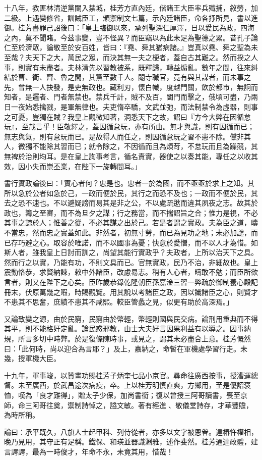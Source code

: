 \begin{pinyinscope}
十八年，教匪林清逆黨闌入禁城，桂芳方直內廷，偕諸王大臣率兵殲捕，敘勞，加二級。上遇變修省，訓誡臣工，頒禦制文七篇，示內廷諸臣，命各抒所見，書以進御。桂芳書罪己詔後曰：「皇上臨御以來，承列聖深仁厚澤，日以愛民為政，四海之內，莫不聞睹。今茲事變，豈不怪異？而臣竊以為此未足為聖德之累。昔孔子論仁至於濟眾，論敬至於安百姓，皆曰：『堯、舜其猶病諸。』豈真以堯、舜之聖為未至哉？夫天下之大，萬民之眾，而決其無一夫之梗者，蓋自古其難之。然而揆之人事，則實有未盡者。夫林清先以習教被系，既釋歸，轉益煽亂。數年之間，往來糾結於曹、衛、齊、魯之間，其黨至數千人。閹寺職官，竟有與其謀者，而未事之先，曾無一人抉發，是吏無政也。藏利刃，懷白幟，度越門關，飲於都市，無詗而知者，是邏者、門者無禁也。禁兵千計，賊不及百，闔門而擊之，俄頃可盡，乃兩日一夜始悉擒戮，是軍無律也。夫吏惰卒驕，文武並弛，而法制禁令為虛器，則事之可憂，豈獨在賊？我皇上觀微知著，洞悉天下之故，詔曰『方今大弊在因循怠玩』，至哉言乎！臣敬繹之，蓋因循怠玩，亦有所由。無才與識，則有因循而已；無志與氣，則有怠玩而已。是故得人而任之，則因循怠玩之習不患不除。儻非其人，微獨不能除其習而已；就令除之，不因循而且為煩苛，不怠玩而且為躁競，其無裨於治則均耳。是在皇上詢事考言，循名責實，器使之以奏其能，專任之以收其效，因小失而崇丕業，在陛下一旋轉間耳。」

書行實政論後曰：「實心者何？忠是也。忠者一於為國，而不亟亟於求上之知。其所以急於公者如急於己，一政而便於民，其行之而恐不及也；一政而不便於民，其去之恐不速也。不以避疑謗而易其是非之公，不以處疏逖而違其夙夜之志。故其於政也，籌之至審，而不為旦夕之謀；行之務當，而不揣詔旨之合；惟力是視，不必其事之諒於人；惟善之從，不必其謀之出於己。若是者謂之實政。夫為臣之道，疇不當忠，然而忠之實蓋如此。非然者，初無寸勞，而已為見功之地；未必加譴，而已存巧避之心。取容於唯諾，而不以國事為憂；快意於愛憎，而不以人才為惜。如斯人者，雖我皇上日討而訓之，尚望其能行實政乎？夫政者，上所以治天下之具。然而行之以實，乃能有功，不則文具而已。官無實政，民乃不治，非細故也。皇上震動恪恭，求賢納諫，敕中外諸臣，改慮易志。稍有人心者，疇敢不勉；而臣所欲言者，則又在陛下之心矣。臣昨歲恭錄乾隆朝臣孫嘉淦三習一弊疏於御制養心殿記冊末，伏原萬幾之暇，時賜觀覽。用其說以考諸臣之政，因以識諸臣之心，則賢才不患其不思奮，庶績不患其不咸熙。較臣管蠡之見，似更有助於高深焉。」

又論致變之源，由於民窮，民窮由於幣輕，幣輕則國與民交病。論刑用重典而不得其平，則不能格奸定亂。論民惑邪教，由士大夫好言因果利益有以導之。因事納規，所言多切中時弊。於是復條陳時事，或見之，謂其未必盡合上意。桂芳慨然曰：「此何時，尚以迎合為言耶？」及上，嘉納之，命暫在軍機處學習行走。未幾，授軍機大臣。

十九年，軍事竣，以贊畫功賜桂芳子炳奎七品小京官。尋命往廣西按事，授漕運總督。未至廣西，於武昌途次病疫，卒。上以桂芳明慎直爽，方鄉用，至是優詔褒恤，嘆為「良才難得」，贈太子少保，加尚書銜；復以曾授三阿哥讀書，喪至京師，命三阿哥往奠，禦制詩悼之，謚文敏。著有經進、敬儀堂詩存，才華豐贍，為時所稱。

論曰：承平既久，八旗人士起甲科、列侍從者，亦多以文字被恩眷。達椿忤權相，晚乃見用，其守正有足稱。鐵保、和瑛並器識淵雅，述作斐然。桂芳通達政體，建言諤諤，最為一時俊才，年命不永，未竟其用，惜哉！


\end{pinyinscope}